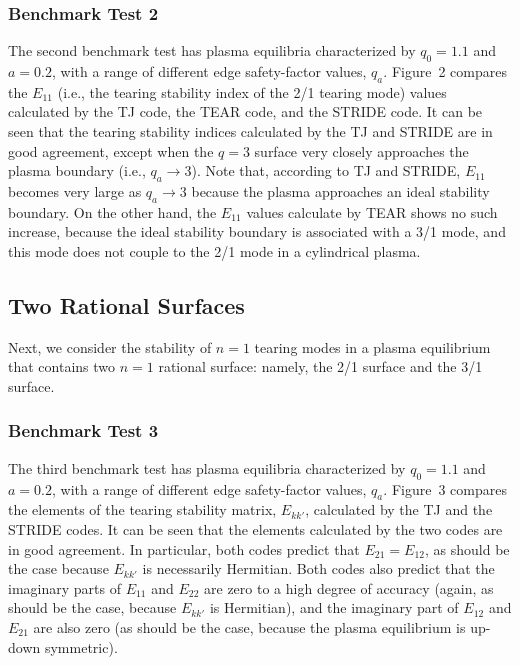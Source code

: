 \documentclass[12pt,prb,aps]{revtex4-1}
\begin{document}
\subsubsection{Benchmark Test 2}
The second benchmark test has plasma equilibria characterized by $q_0=1.1$ and $a=0.2$, with a range of different edge safety-factor values, $q_a$. 
Figure~2 compares the $E_{11}$ (i.e.,
the tearing stability index of the 2/1 tearing mode) values calculated by the TJ code, the TEAR code, and
the STRIDE code. It can be seen that the tearing stability indices calculated by the TJ and STRIDE are in good agreement, except when the $q=3$ surface very closely approaches the
plasma boundary (i.e., $q_a\rightarrow 3$). 
Note that, according to TJ and STRIDE,  $E_{11}$ becomes very large as $q_a\rightarrow 3$ because the plasma approaches an ideal stability boundary. On the other hand,
the $E_{11}$ values calculate by TEAR shows no such increase, because the ideal stability boundary is associated with a 3/1 mode, and this mode does not couple to the 2/1 mode in a cylindrical plasma. 

\subsection{Two Rational Surfaces}
 Next, we consider the stability of $n=1$ tearing modes 
in a plasma equilibrium  that  contains two $n=1$ rational surface: namely, the 2/1 surface and the 3/1 surface. 

\subsubsection{Benchmark Test 3}
The third benchmark test has plasma equilibria characterized by $q_0=1.1$ and $a=0.2$, with a range of different edge safety-factor values, $q_a$. 
Figure~3 compares the elements of the tearing stability matrix, $E_{kk'}$,  calculated by the TJ and the STRIDE codes. It can be seen that the elements calculated by
the two codes are in good agreement. In particular, both codes predict that $E_{21}=E_{12}$, as should be the case because $E_{kk'}$ is necessarily Hermitian.\cite{tj} 
Both codes also predict that the imaginary parts of $E_{11}$ and $E_{22}$ are zero to a high degree of accuracy (again, as should be the case, because $E_{kk'}$ is Hermitian),
and the imaginary part of $E_{12}$ and $E_{21}$ are also zero (as should be the case, because the plasma equilibrium is up-down symmetric). 
\end{document}
